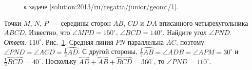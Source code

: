 \ifsolution
\begin{figure}\centering
    \caption{к задаче \ref{solution:2013/ru/regatta/junior/geomt/1}.}
    \label{fig:solution:2013/ru/regatta/junior/geomt/1}
\end{figure}
\fi %


\problem
Точки $M$, $N$, $P$~--- середины сторон $AB$, $CD$ и $DA$ вписанного
четырехугольника $ABCD$.
Известно, что $\angle MPD = 150^\circ$, $\angle BCD = 140^\circ$.
Найдите угол $\angle PND$. 
\solution%
\label{solution:2013/ru/regatta/junior/geomt/1}%
\emph{Ответ:} $110^\circ$.
Рис.~\ref{fig:solution:2013/ru/regatta/junior/geomt/1}.
Средняя линия $PN$ параллельна $AC$, поэтому
$\angle PND = \angle ACD = \frac{1}{2} \wideparen{AD}$.
С другой стороны,
$\frac{1}{2} \wideparen{AB} = \angle ADB = \angle APM = 30^\circ$
и $\frac{1}{2} \wideparen{BCD} = 40^\circ$.
Поскольку
$\wideparen{AD} + \wideparen{AB} + \wideparen{BCD} = 360^\circ$,
то $\angle PND = 110^\circ$.
\endproblem
